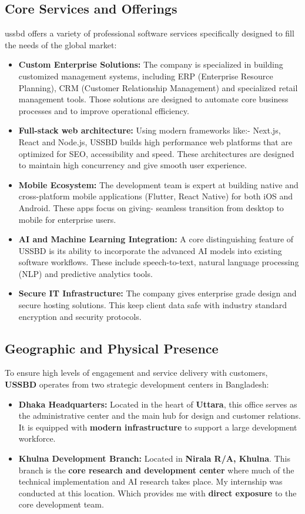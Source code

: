 \documentclass[oneside]{thesis-library}
\begin{document}
\subsection{Core Services and Offerings}
\Gls{ussbd} offers a variety of professional software services specifically designed to fill the needs of the global market:
\begin{itemize}
    \item \textbf{Custom Enterprise Solutions:} The company is specialized in building customized management systems, including ERP (Enterprise Resource Planning), CRM (Customer Relationship Management) and specialized retail management tools. Those solutions are designed to automate core business processes and to improve operational efficiency.
    \item \textbf{Full-stack web architecture:} Using modern frameworks like:- Next.js, React and Node.js, USSBD builds high performance web platforms that are optimized for SEO, accessibility and speed. These architectures are designed to maintain high concurrency and give smooth user experience.
    \item \textbf{Mobile Ecosystem:} The development team is expert at building native and cross-platform mobile applications (Flutter, React Native) for both iOS and Android. These apps focus on giving- seamless transition from desktop to mobile for enterprise users.
    \item \textbf{AI and Machine Learning Integration:} A core distinguishing feature of USSBD is its ability to incorporate the advanced AI models into existing software workflows. These include speech-to-text, natural language processing (NLP) and predictive analytics tools.
    \item \textbf{Secure IT Infrastructure:} The company gives enterprise grade design and secure hosting solutions. This keep client data safe with industry standard encryption and security protocols.
\end{itemize}

\subsection{Geographic and Physical Presence}
To ensure high levels of engagement and service delivery with customers, \textbf{USSBD} operates from two strategic development centers in Bangladesh:
\begin{itemize}
    \item \textbf{Dhaka Headquarters:} Located in the heart of \textbf{Uttara}, this office serves as the administrative center and the main hub for design and customer relations. It is equipped with \textbf{modern infrastructure} to support a large development workforce.
    \item \textbf{Khulna Development Branch:} Located in \textbf{Nirala R/A, Khulna}. This branch is the \textbf{core research and development center} where much of the technical implementation and AI research takes place. My internship was conducted at this location. Which provides me with \textbf{direct exposure} to the core development team.
\end{itemize}
\end{document}
